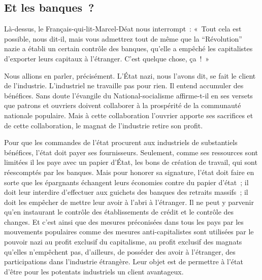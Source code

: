 \documentclass[french,twoside]{book} %
\begin{document}
\subsection[Et les banques ?]{Et les banques ?}
\noindent Là-dessus, le Français-qui-lit-Marcel-Déat nous interrompt : « Tout cela est possible, nous dit-il, mais vous admettrez tout de même que la “Révolution” nazie a établi un certain contrôle des banques, qu’elle a empêché les capitalistes d’exporter leurs capitaux à l’étranger. C’est quelque chose, ça ! »\par
Nous allions en parler, précisément. L’État nazi, nous l’avons dit, se fait le client de l’industrie. L’industriel ne travaille pas pour rien. Il entend accumuler des bénéfices. Sans doute l’évangile du National-socialisme affirme-t-il en ses versets que patrons et ouvriers doivent collaborer à la prospérité de la communauté nationale populaire. Mais à cette collaboration l’ouvrier apporte ses sacrifices et de cette collaboration, le magnat de l’industrie retire son profit.\par
Pour que les commandes de l’état procurent aux industriels de substantiels bénéfices, l’état doit payer ses fournisseurs. Seulement, comme ses ressources sont limitées il les paye avec un papier d’État, les bons de création de travail, qui sont réescomptés par les banques. Mais pour honorer sa signature, l’état doit faire en sorte que les épargnants échangent leurs économies contre du papier d’état ; il doit leur interdire d’effectuer aux guichets des banques des retraits massifs ; il doit les empêcher de mettre leur avoir à l’abri à l’étranger. Il ne peut y parvenir qu’en instaurant le contrôle des établissements de crédit et le contrôle des changes. Et c’est ainsi que des mesures préconisées dans tous les pays par les mouvements populaires comme des mesures anti-capitalistes sont utilisées par le pouvoir nazi au profit exclusif du capitalisme, au profit exclusif des magnats qu’elles n’empêchent pas, d’ailleurs, de posséder des avoir à l’étranger, des participations dans l’industrie étrangère. Leur objet est de permettre à l’état d’être pour les potentats industriels un client avantageux.
\end{document}
